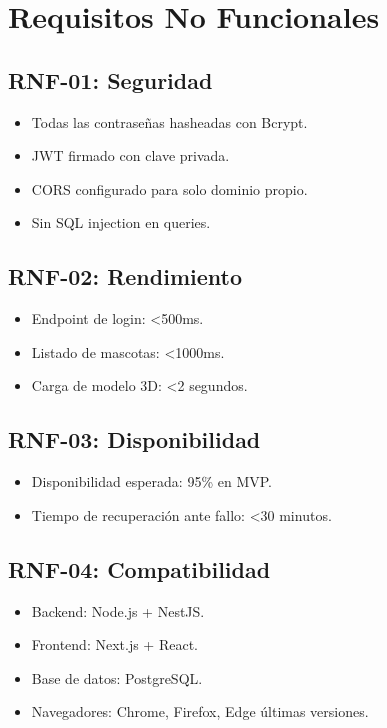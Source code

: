 \documentclass[12pt,a4paper]{article}
\begin{document}
\section{Requisitos No Funcionales}

\subsection{RNF-01: Seguridad}
\begin{itemize}[leftmargin=*]
    \item Todas las contrase\~nas hasheadas con Bcrypt.
    \item JWT firmado con clave privada.
    \item CORS configurado para solo dominio propio.
    \item Sin SQL injection en queries.
\end{itemize}

\subsection{RNF-02: Rendimiento}
\begin{itemize}[leftmargin=*]
    \item Endpoint de login: <500ms.
    \item Listado de mascotas: <1000ms.
    \item Carga de modelo 3D: <2 segundos.
\end{itemize}

\subsection{RNF-03: Disponibilidad}
\begin{itemize}[leftmargin=*]
    \item Disponibilidad esperada: 95\% en MVP.
    \item Tiempo de recuperaci\'on ante fallo: <30 minutos.
\end{itemize}

\subsection{RNF-04: Compatibilidad}
\begin{itemize}[leftmargin=*]
    \item Backend: Node.js + NestJS.
    \item Frontend: Next.js + React.
    \item Base de datos: PostgreSQL.
    \item Navegadores: Chrome, Firefox, Edge \'ultimas versiones.
\end{itemize}
\end{document}
